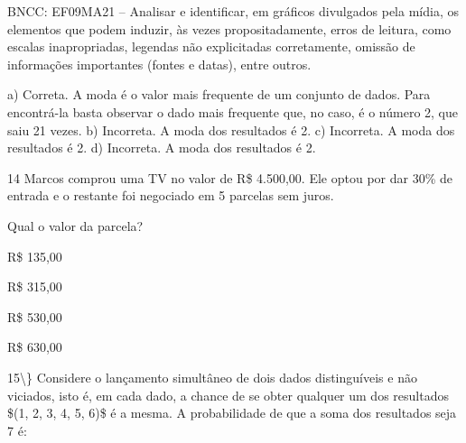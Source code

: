 \begin{escolha}
\begin{escolha}
\begin{escolha}
\begin{escolha}
{\begin{boxmedio}
\begin{boxpeq}
\begin{q°}
\begin{boxmedio}
\begin{boxpeq}
\begin{boxpeq}
\begin{boxmedio}
\begin{boxmedio}
\begin{boxmedio}
\begin{largebox}
\begin{boxmedio}
{\begin{escolha}
\begin{escolha}
\begin{escolha}
\begin{escolha}
\begin{escolha}
\begin{escolha}
{BNCC: EF09MA21 -- Analisar e identificar, em gráficos divulgados pela
mídia, os elementos que podem induzir, às vezes propositadamente, erros
de leitura, como escalas inapropriadas, legendas não explicitadas
corretamente, omissão de informações importantes (fontes e datas), entre
outros.

a) Correta. A moda é o valor mais frequente de um conjunto de dados. Para
encontrá-la basta observar o dado mais frequente que, no caso, é o número
2, que saiu 21 vezes.
b) Incorreta. A moda dos resultados é 2.
c) Incorreta. A moda dos resultados é 2.
d) Incorreta. A moda dos resultados é 2.}

\num{14} Marcos comprou uma TV no valor de R\$ 4.500,00. Ele optou por dar
30\% de entrada e o restante foi negociado em 5 parcelas sem juros.

Qual o valor da parcela?

\begin{escolha}
  \item R\$ 135,00

  \item R\$ 315,00

  \item R\$ 530,00

  \item R\$ 630,00
\end{escolha}


\num{15\} Considere o lançamento simultâneo de dois dados
distinguíveis e não viciados, isto é, em cada dado, a chance de se obter
qualquer um dos resultados $(1, 2, 3, 4, 5, 6)$ é a mesma. A probabilidade
de que a soma dos resultados seja 7 é:

}
\end{escolha}
\end{escolha}
\end{escolha}
\end{escolha}
\end{escolha}
\end{escolha}}
\end{boxmedio}
\end{largebox}
\end{boxmedio}
\end{boxmedio}
\end{boxmedio}
\end{boxpeq}
\end{boxpeq}
\end{boxmedio}
\end{q°}
\end{boxpeq}
\end{boxmedio}}
\end{escolha}
\end{escolha}
\end{escolha}
\end{escolha}
